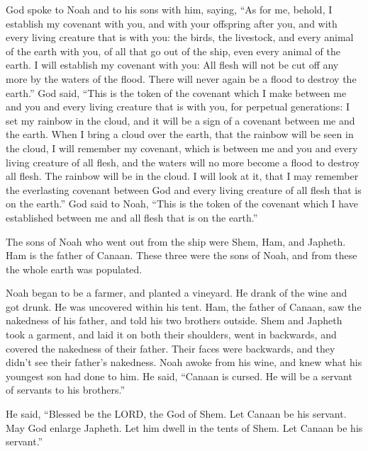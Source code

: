  God spoke to Noah and to his sons with him, saying,
 ``As for me, behold, I establish my covenant with you, and
with your offspring after you,  and with every living
creature that is with you: the birds, the livestock, and every animal of
the earth with you, of all that go out of the ship, even every animal of
the earth.  I will establish my covenant with you: All
flesh will not be cut off any more by the waters of the flood. There
will never again be a flood to destroy the earth.''  God
said, ``This is the token of the covenant which I make between me and
you and every living creature that is with you, for perpetual
generations:  I set my rainbow in the cloud, and it will be
a sign of a covenant between me and the earth.  When I
bring a cloud over the earth, that the rainbow will be seen in the
cloud,  I will remember my covenant, which is between me
and you and every living creature of all flesh, and the waters will no
more become a flood to destroy all flesh.  The rainbow will
be in the cloud. I will look at it, that I may remember the everlasting
covenant between God and every living creature of all flesh that is on
the earth.''  God said to Noah, ``This is the token of the
covenant which I have established between me and all flesh that is on
the earth.''

 The sons of Noah who went out from the ship were Shem,
Ham, and Japheth. Ham is the father of Canaan.  These three
were the sons of Noah, and from these the whole earth was populated.

 Noah began to be a farmer, and planted a vineyard.
 He drank of the wine and got drunk. He was uncovered
within his tent.  Ham, the father of Canaan, saw the
nakedness of his father, and told his two brothers outside.
 Shem and Japheth took a garment, and laid it on both their
shoulders, went in backwards, and covered the nakedness of their father.
Their faces were backwards, and they didn't see their father's
nakedness.  Noah awoke from his wine, and knew what his
youngest son had done to him.  He said, ``Canaan is cursed.
He will be a servant of servants to his brothers.''

 He said, ``Blessed be the LORD, the God of Shem. Let
Canaan be his servant.  May God enlarge Japheth. Let him
dwell in the tents of Shem. Let Canaan be his servant.''

